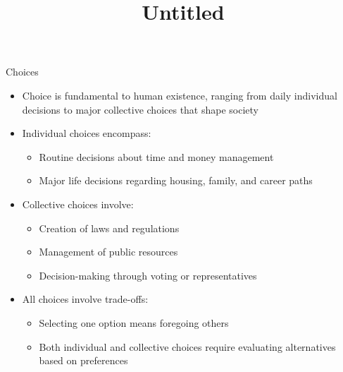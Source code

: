 \documentclass[
  ignorenonframetext,
]{beamer}
\title{Untitled}
\author{}
\date{}
\providecommand{\tightlist}{%
  \setlength{\itemsep}{0pt}\setlength{\parskip}{0pt}}\usepackage{longtable,booktabs,array}
\begin{document}
\frame{\titlepage}

\begin{frame}{Choices}
\label{choices}
\begin{itemize}
\item
  Choice is fundamental to human existence, ranging from daily
  individual decisions to major collective choices that shape society
\item
  Individual choices encompass:

  \begin{itemize}
  \tightlist
  \item
    Routine decisions about time and money management
  \item
    Major life decisions regarding housing, family, and career paths
  \end{itemize}
\item
  Collective choices involve:

  \begin{itemize}
  \tightlist
  \item
    Creation of laws and regulations
  \item
    Management of public resources
  \item
    Decision-making through voting or representatives
  \end{itemize}
\item
  All choices involve trade-offs:

  \begin{itemize}
  \tightlist
  \item
    Selecting one option means foregoing others
  \item
    Both individual and collective choices require evaluating
    alternatives based on preferences
  \end{itemize}
\end{itemize}
\end{frame}
\end{document}
